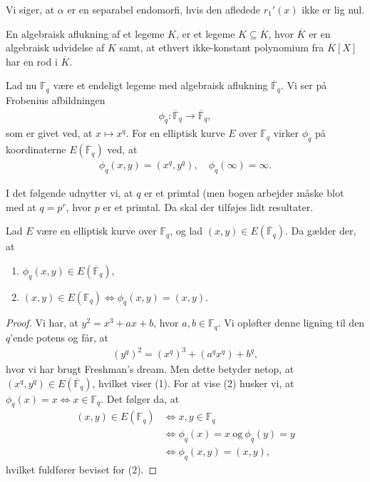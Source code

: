 Vi siger, at $\alpha$ er en separabel endomorfi, hvis den afledede $r_1'(x)$ ikke
er lig nul.


\begin{definition}
En algebraisk aflukning af et legeme $K$, er et legeme
$K \subseteq \overline{K}$, hvor $\overline{K}$ er en 
algebraisk udvidelse af $K$ samt, at ethvert ikke-konstant
polynomium fra $\overline{K}[X]$ har en rod i $\overline{K}$. 
\end{definition}






Lad nu $\mathbb{F}_q$ være et endeligt
legeme med algebraisk aflukning $\overline{\mathbb{F}}_q$. Vi ser på
Frobenius afbildningen 
\begin{align*}
	\phi_q : \overline{\mathbb{F}}_q \to \overline{\mathbb{F}}_q,
\end{align*}
som er givet ved, at $x \mapsto x^q$. For en elliptisk kurve $E$ over
$\mathbb{F}_q$ virker $\phi_q$ på koordinaterne $E(\overline{\mathbb{F}}_q)$ 
ved, at 
\begin{align*}
	\phi_q(x, y) = (x^q, y^q), \quad \phi_q (\infty) = \infty.
\end{align*}

I det følgende udnytter vi, at $q$ er et primtal (men bogen arbejder
måske blot med at $q = p^r$, hvor $p$ er et primtal. Da skal der tilføjes
lidt resultater.

\begin{lemma}
Lad $E$ være en elliptisk kurve over $\mathbb{F}_q$, og lad 
$(x, y) \in E(\overline{\mathbb{F}}_q)$. Da gælder der, at 
\begin{enumerate}
	\item $\phi_q(x, y) \in E(\overline{\mathbb{F}}_q)$,
	\item $(x, y) \in E(\mathbb{F}_q) \Leftrightarrow \phi_q(x, y)=(x, y)$.
\end{enumerate}
\end{lemma}
\begin{proof}
Vi har, at $y^2 = x^3 + ax + b$, hvor $a, b \in \mathbb{F}_q$. Vi opløfter 
denne ligning til den $q$'ende potens og får, at 
\begin{align*}
	(y^q)^2 = (x^q)^3 + (a^q x^q) + b^q,
\end{align*}
hvor vi har brugt Freshman's dream. Men dette betyder netop, at 
$(x^q, y^q) \in E(\overline{\mathbb{F}}_q)$, hvilket viser (1).
For at vise (2) husker vi, at $\phi_q(x) = x \Leftrightarrow x \in \mathbb{F}_q$.
Det følger da, at 
\begin{align*}
	(x, y) \in E(\mathbb{F}_q) &\Leftrightarrow x, y \in \mathbb{F}_q \\
	&\Leftrightarrow \phi_q(x) = x \ \text{og} \ \phi_q(y) = y \\
	&\Leftrightarrow \phi_q(x, y) = (x, y),
\end{align*}
hvilket fuldfører beviset for (2).
\end{proof}


